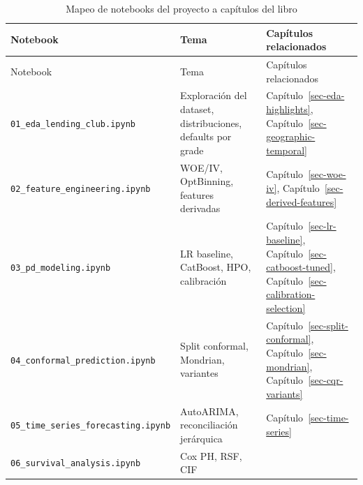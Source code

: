 \documentclass[
  spanish,
  11pt,
  letterpaper,
]{scrbook}
\theoremstyle{plain}
\theoremstyle{remark}
\begin{document}
\begin{longtable}[]{@{}
  >{\raggedright\arraybackslash}p{}
  >{\raggedright\arraybackslash}p{}
  >{\raggedright\arraybackslash}p{}@{}}
\caption{Mapeo de notebooks del proyecto a capítulos del
libro}\label{tbl-notebook-chapter-map}\tabularnewline
\toprule\noalign{}
\begin{minipage}[b]{\linewidth}\raggedright
Notebook
\end{minipage} & \begin{minipage}[b]{\linewidth}\raggedright
Tema
\end{minipage} & \begin{minipage}[b]{\linewidth}\raggedright
Capítulos relacionados
\end{minipage} \\
\midrule\noalign{}
\endfirsthead
\toprule\noalign{}
\begin{minipage}[b]{\linewidth}\raggedright
Notebook
\end{minipage} & \begin{minipage}[b]{\linewidth}\raggedright
Tema
\end{minipage} & \begin{minipage}[b]{\linewidth}\raggedright
Capítulos relacionados
\end{minipage} \\
\midrule\noalign{}
\endhead
\bottomrule\noalign{}
\endlastfoot
\texttt{01\_eda\_lending\_club.ipynb} & Exploración del dataset,
distribuciones, defaults por grade & Capítulo~\ref{sec-eda-highlights},
Capítulo~\ref{sec-geographic-temporal} \\
\texttt{02\_feature\_engineering.ipynb} & WOE/IV, OptBinning, features
derivadas & Capítulo~\ref{sec-woe-iv},
Capítulo~\ref{sec-derived-features} \\
\texttt{03\_pd\_modeling.ipynb} & LR baseline, CatBoost, HPO,
calibración & Capítulo~\ref{sec-lr-baseline},
Capítulo~\ref{sec-catboost-tuned},
Capítulo~\ref{sec-calibration-selection} \\
\texttt{04\_conformal\_prediction.ipynb} & Split conformal, Mondrian,
variantes & Capítulo~\ref{sec-split-conformal},
Capítulo~\ref{sec-mondrian}, Capítulo~\ref{sec-cqr-variants} \\
\texttt{05\_time\_series\_forecasting.ipynb} & AutoARIMA, reconciliación
jerárquica & Capítulo~\ref{sec-time-series} \\
\texttt{06\_survival\_analysis.ipynb} & Cox PH, RSF, CIF &

\end{longtable}
\end{document}

